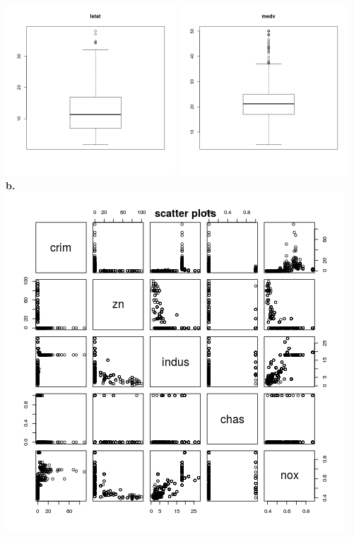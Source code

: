 \documentclass{article}
\begin{document}
\includegraphics[width=2.5in]{13.png}
\includegraphics[width=2.5in]{14.png}
~\\
\clearpage
\textbf{b.}\\
\includegraphics[width=5in]{scatter.png}
\end{document}
